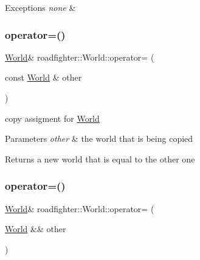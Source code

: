 \begin{DoxyExceptions}{Exceptions}
{\em none} & \\
\hline
\end{DoxyExceptions}
\mbox{\label{classroadfighter_1_1World_a31482bef8cfc86abc6326a4ffca74872}} 
\subsubsection{\texorpdfstring{operator=()}{operator=()}\hspace{0.1cm}{\footnotesize\ttfamily [1/2]}}
{\footnotesize\ttfamily \hyperlink{classroadfighter_1_1World}{World}\& roadfighter\+::\+World\+::operator= (\begin{DoxyParamCaption}\item[{const \hyperlink{classroadfighter_1_1World}{World} \&}]{other }\end{DoxyParamCaption})\hspace{0.3cm}{\ttfamily [default]}}

copy assigment for \hyperlink{classroadfighter_1_1World}{World} 
\begin{DoxyParams}{Parameters}
{\em other} & the world that is being copied \\
\hline
\end{DoxyParams}
\begin{DoxyReturn}{Returns}
a new world that is equal to the other one 
\end{DoxyReturn}
\mbox{\label{classroadfighter_1_1World_ae2c0a8c3c8abd624087d5c5d82c2d5fd}} 
\subsubsection{\texorpdfstring{operator=()}{operator=()}\hspace{0.1cm}{\footnotesize\ttfamily [2/2]}}
{\footnotesize\ttfamily \hyperlink{classroadfighter_1_1World}{World}\& roadfighter\+::\+World\+::operator= (\begin{DoxyParamCaption}\item[{\hyperlink{classroadfighter_1_1World}{World} \&\&}]{other }\end{DoxyParamCaption})\hspace{0.3cm}{\ttfamily [default]}}

